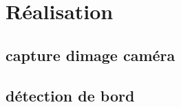 \chapter{Réalisation}\label{realisation}
\blindtext

\section{capture dimage caméra}\label{realisation.capture}

\section{détection de bord}

